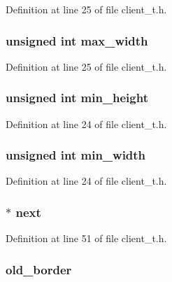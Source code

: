 Definition at line 25 of file client\_\-t.h.

\hypertarget{struct_client_ac94bbe4c69d1d19af62fa63e54d5b760}{
\subsubsection[{max\_\-width}]{\setlength{\rightskip}{0pt plus 5cm}unsigned int {\bf max\_\-width}}}
\label{struct_client_ac94bbe4c69d1d19af62fa63e54d5b760}


Definition at line 25 of file client\_\-t.h.

\hypertarget{struct_client_a3d24f41c706cbbc405fbbf54db56c1d0}{
\subsubsection[{min\_\-height}]{\setlength{\rightskip}{0pt plus 5cm}unsigned int {\bf min\_\-height}}}
\label{struct_client_a3d24f41c706cbbc405fbbf54db56c1d0}


Definition at line 24 of file client\_\-t.h.

\hypertarget{struct_client_aa245bd84a82eece7d7eaef64599c17fd}{
\subsubsection[{min\_\-width}]{\setlength{\rightskip}{0pt plus 5cm}unsigned int {\bf min\_\-width}}}
\label{struct_client_aa245bd84a82eece7d7eaef64599c17fd}


Definition at line 24 of file client\_\-t.h.

\hypertarget{struct_client_a91333367c3890374bf930ff44f4d3089}{
\subsubsection[{next}]{$\ast$ {\bf next}}}
\label{struct_client_a91333367c3890374bf930ff44f4d3089}


Definition at line 51 of file client\_\-t.h.

\hypertarget{struct_client_a80fc22c63df11c422930f6a4157edf79}{
\subsubsection[{old\_\-border}]{ {\bf old\_\-border}}}
\label{struct_client_a80fc22c63df11c422930f6a4157edf79}


